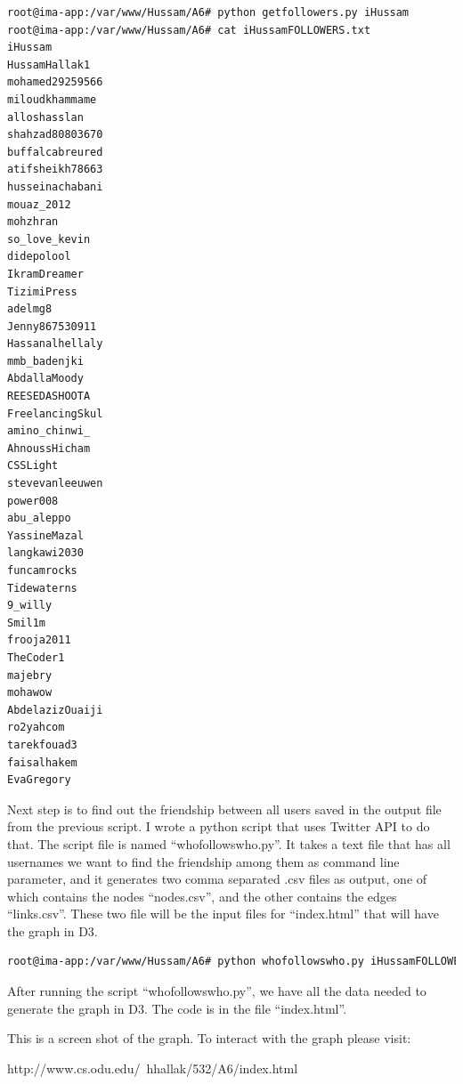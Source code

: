 \documentclass[a4paper, 11pt]{article}
\begin{document}
\begin{lstlisting}[language=bash, breakatwhitespace=〈false), label=Running getfollowers.py, caption=Running getfollowers.py]
root@ima-app:/var/www/Hussam/A6# python getfollowers.py iHussam
root@ima-app:/var/www/Hussam/A6# cat iHussamFOLLOWERS.txt
iHussam
HussamHallak1
mohamed29259566
miloudkhammame
alloshasslan
shahzad80803670
buffalcabreured
atifsheikh78663
husseinachabani
mouaz_2012
mohzhran
so_love_kevin
didepolool
IkramDreamer
TizimiPress
adelmg8
Jenny867530911
Hassanalhellaly
mmb_badenjki
AbdallaMoody
REESEDASHOOTA
FreelancingSkul
amino_chinwi_
AhnoussHicham
CSSLight
stevevanleeuwen
power008
abu_aleppo
YassineMazal
langkawi2030
funcamrocks
Tidewaterns
9_willy
Smil1m
frooja2011
TheCoder1
majebry
mohawow
AbdelazizOuaiji
ro2yahcom
tarekfouad3
faisalhakem
EvaGregory
\end{lstlisting}

Next step is to find out the friendship between all users saved in the output file from the previous script. I wrote a python script that uses Twitter API to do that. The script file is named ``whofollowswho.py''. It takes a text file that has all usernames we want to find the friendship among them as command line parameter, and it generates two comma separated .csv files as output, one of which contains the nodes ``nodes.csv'', and the other contains the edges ``links.csv''. These two file will be the input files for ``index.html'' that will have the graph in D3. 



\begin{lstlisting}[language=bash, breakatwhitespace=〈false), label=Running whofollowswho.py, caption=Running whofollowswho.py]
root@ima-app:/var/www/Hussam/A6# python whofollowswho.py iHussamFOLLOWERS.txt
\end{lstlisting}

After running the script ``whofollowswho.py'', we have all the data needed to generate the graph in D3. The code is in the file ``index.html''.



This is a screen shot of the graph. To interact with the graph please visit:

http://www.cs.odu.edu/~hhallak/532/A6/index.html
\end{document}
